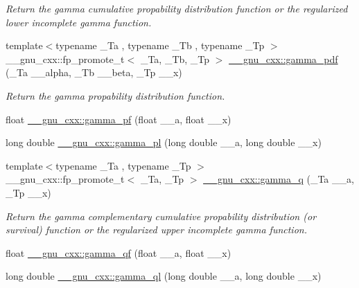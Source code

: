 \begin{DoxyCompactItemize}
\begin{DoxyCompactList}\small\item\em Return the gamma cumulative propability distribution function or the regularized lower incomplete gamma function. \end{DoxyCompactList}\item 
{\footnotesize template$<$typename \+\_\+\+Ta , typename \+\_\+\+Tb , typename \+\_\+\+Tp $>$ }\\\+\_\+\+\_\+gnu\+\_\+cxx\+::fp\+\_\+promote\+\_\+t$<$ \+\_\+\+Ta, \+\_\+\+Tb, \+\_\+\+Tp $>$ \hyperlink{group__gnu__math__spec__func_ga55f530c37387a6c10c601c5838f3be00}{\+\_\+\+\_\+gnu\+\_\+cxx\+::gamma\+\_\+pdf} (\+\_\+\+Ta \+\_\+\+\_\+alpha, \+\_\+\+Tb \+\_\+\+\_\+beta, \+\_\+\+Tp \+\_\+\+\_\+x)
\begin{DoxyCompactList}\small\item\em Return the gamma propability distribution function. \end{DoxyCompactList}\item 
float \hyperlink{group__gnu__math__spec__func_gac9a59be05877d3c14fa95bebcf15e8df}{\+\_\+\+\_\+gnu\+\_\+cxx\+::gamma\+\_\+pf} (float \+\_\+\+\_\+a, float \+\_\+\+\_\+x)
\item 
long double \hyperlink{group__gnu__math__spec__func_gaa37f4adf9942ce8e095f440963b330a6}{\+\_\+\+\_\+gnu\+\_\+cxx\+::gamma\+\_\+pl} (long double \+\_\+\+\_\+a, long double \+\_\+\+\_\+x)
\item 
{\footnotesize template$<$typename \+\_\+\+Ta , typename \+\_\+\+Tp $>$ }\\\+\_\+\+\_\+gnu\+\_\+cxx\+::fp\+\_\+promote\+\_\+t$<$ \+\_\+\+Ta, \+\_\+\+Tp $>$ \hyperlink{group__gnu__math__spec__func_ga10c246b2fa2ce000dc5d7c81e9e98c58}{\+\_\+\+\_\+gnu\+\_\+cxx\+::gamma\+\_\+q} (\+\_\+\+Ta \+\_\+\+\_\+a, \+\_\+\+Tp \+\_\+\+\_\+x)
\begin{DoxyCompactList}\small\item\em Return the gamma complementary cumulative propability distribution (or survival) function or the regularized upper incomplete gamma function. \end{DoxyCompactList}\item 
float \hyperlink{group__gnu__math__spec__func_ga3ee8d2c40b904952538709cbb0e664a4}{\+\_\+\+\_\+gnu\+\_\+cxx\+::gamma\+\_\+qf} (float \+\_\+\+\_\+a, float \+\_\+\+\_\+x)
\item 
long double \hyperlink{group__gnu__math__spec__func_ga5364a098596681809294d25741539ffc}{\+\_\+\+\_\+gnu\+\_\+cxx\+::gamma\+\_\+ql} (long double \+\_\+\+\_\+a, long double \+\_\+\+\_\+x)

\end{DoxyCompactItemize}
